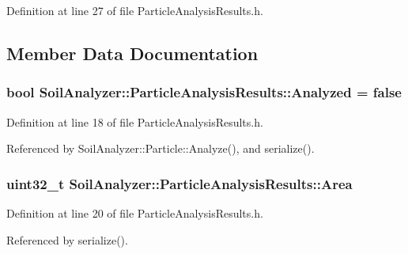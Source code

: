 Definition at line 27 of file Particle\+Analysis\+Results.\+h.



\subsection{Member Data Documentation}
\hypertarget{class_soil_analyzer_1_1_particle_analysis_results_abfb8465c0cfbe9a6ad4d844f6269676f}{}
\subsubsection[{Analyzed}]{\setlength{\rightskip}{0pt plus 5cm}bool Soil\+Analyzer\+::\+Particle\+Analysis\+Results\+::\+Analyzed = false}\label{class_soil_analyzer_1_1_particle_analysis_results_abfb8465c0cfbe9a6ad4d844f6269676f}


Definition at line 18 of file Particle\+Analysis\+Results.\+h.



Referenced by Soil\+Analyzer\+::\+Particle\+::\+Analyze(), and serialize().

\hypertarget{class_soil_analyzer_1_1_particle_analysis_results_a1a6dbe8880b29f51ba3d8ec28b96ed45}{}
\subsubsection[{Area}]{\setlength{\rightskip}{0pt plus 5cm}uint32\+\_\+t Soil\+Analyzer\+::\+Particle\+Analysis\+Results\+::\+Area}\label{class_soil_analyzer_1_1_particle_analysis_results_a1a6dbe8880b29f51ba3d8ec28b96ed45}


Definition at line 20 of file Particle\+Analysis\+Results.\+h.



Referenced by serialize().

\hypertarget{class_soil_analyzer_1_1_particle_analysis_results_a75230aa0675b2df489c08bcfffb43b97}{}
